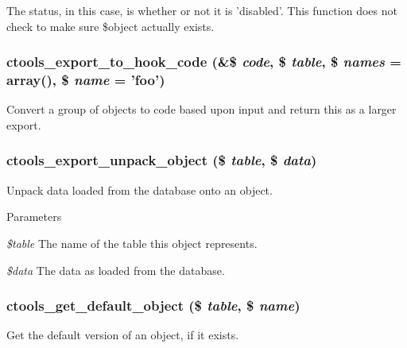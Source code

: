 The status, in this case, is whether or not it is 'disabled'. This function does not check to make sure \$object actually exists. \hypertarget{export_8inc_a193d97a428b46c35a20fc0e8023fef62}{
\subsubsection[{ctools\_\-export\_\-to\_\-hook\_\-code}]{\setlength{\rightskip}{0pt plus 5cm}ctools\_\-export\_\-to\_\-hook\_\-code (\&\$ {\em code}, \/  \$ {\em table}, \/  \$ {\em names} = {\ttfamily array()}, \/  \$ {\em name} = {\ttfamily 'foo'})}}
\label{export_8inc_a193d97a428b46c35a20fc0e8023fef62}
Convert a group of objects to code based upon input and return this as a larger export. \hypertarget{export_8inc_a6ab705acdffb0cf4a5db1357c82cbeb5}{
\subsubsection[{ctools\_\-export\_\-unpack\_\-object}]{\setlength{\rightskip}{0pt plus 5cm}ctools\_\-export\_\-unpack\_\-object (\$ {\em table}, \/  \$ {\em data})}}
\label{export_8inc_a6ab705acdffb0cf4a5db1357c82cbeb5}
Unpack data loaded from the database onto an object.


\begin{DoxyParams}{Parameters}
\item[{\em \$table}]The name of the table this object represents. \item[{\em \$data}]The data as loaded from the database. \end{DoxyParams}
\hypertarget{export_8inc_a35947bcb7777884b7c5c4b3fe1c3a14a}{
\subsubsection[{ctools\_\-get\_\-default\_\-object}]{\setlength{\rightskip}{0pt plus 5cm}ctools\_\-get\_\-default\_\-object (\$ {\em table}, \/  \$ {\em name})}}
\label{export_8inc_a35947bcb7777884b7c5c4b3fe1c3a14a}
Get the default version of an object, if it exists.

